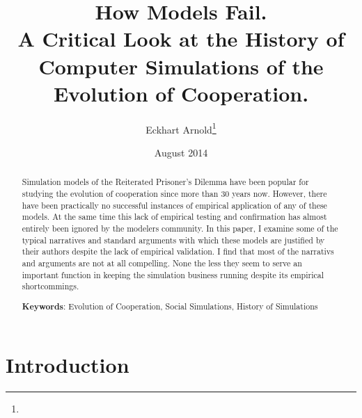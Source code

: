 \documentclass[graybox, English]{svmult}
\begin{document}
 


\title{How Models Fail.\\A Critical Look at the History of Computer Simulations of the Evolution of Cooperation.}


\author{Eckhart Arnold\footnote{}}

\date{August 2014}
 
\maketitle

\begin{abstract}
Simulation models of the Reiterated Prisoner's Dilemma have been
popular for studying the evolution of cooperation since more than 30
years now. However, there have been practically no successful
instances of empirical application of any of these models. At the
same time this lack of empirical testing and confirmation has almost
entirely been ignored by the modelers community. In this paper, I
examine some of the typical narratives and standard arguments with
which these models are justified by their authors despite the lack of
empirical validation. I find that most of the narrativs and arguments
are not at all compelling. None the less they seem to serve an
important function in keeping the simulation business running despite
its empirical shortcommings. 
\begin{flushleft}
{\bf Keywords}: Evolution of Cooperation, Social Simulations, History of Simulations
\end{flushleft}
\end{abstract}


\newpage 
\section{Introduction}
\end{document}
